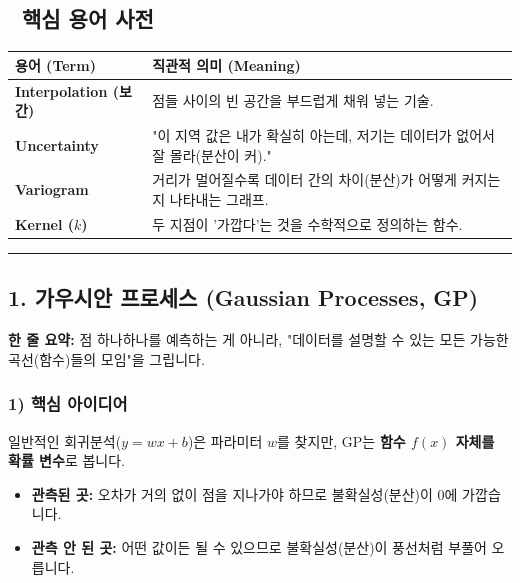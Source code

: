 \documentclass[11pt,a4paper]{book}
\theoremstyle{definition}
\begin{document}
\subsection*{📝 핵심 용어 사전}
\begin{table}[h]
\centering
\begin{tabularx}{\textwidth}{|p{}|X|}
\hline
\textbf{용어 (Term)} & \textbf{직관적 의미 (Meaning)} \\
\hline
\textbf{Interpolation (보간)} & 점들 사이의 빈 공간을 부드럽게 채워 넣는 기술. \\
\hline
\textbf{Uncertainty} & "이 지역 값은 내가 확실히 아는데, 저기는 데이터가 없어서 잘 몰라(분산이 커)." \\
\hline
\textbf{Variogram} & 거리가 멀어질수록 데이터 간의 차이(분산)가 어떻게 커지는지 나타내는 그래프. \\
\hline
\textbf{Kernel ($k$)} & 두 지점이 '가깝다'는 것을 수학적으로 정의하는 함수. \\
\hline
\end{tabularx}
\end{table}

\vspace{0.5cm}\hrule\vspace{0.5cm}

\subsection{1. 가우시안 프로세스 (Gaussian Processes, GP)}


\begin{conceptbox}[title={개념 1: 함수의 확률 분포}]
\textbf{한 줄 요약:} 점 하나하나를 예측하는 게 아니라, "데이터를 설명할 수 있는 모든 가능한 곡선(함수)들의 모임"을 그립니다.
\end{conceptbox}

\subsubsection*{1) 핵심 아이디어}
일반적인 회귀분석($y = wx + b$)은 파라미터 $w$를 찾지만, GP는 \textbf{함수 $f(x)$ 자체를 확률 변수}로 봅니다.
\begin{itemize}
    \item \textbf{관측된 곳:} 오차가 거의 없이 점을 지나가야 하므로 불확실성(분산)이 0에 가깝습니다.
    \item \textbf{관측 안 된 곳:} 어떤 값이든 될 수 있으므로 불확실성(분산)이 풍선처럼 부풀어 오릅니다.
\end{itemize}
\end{document}
